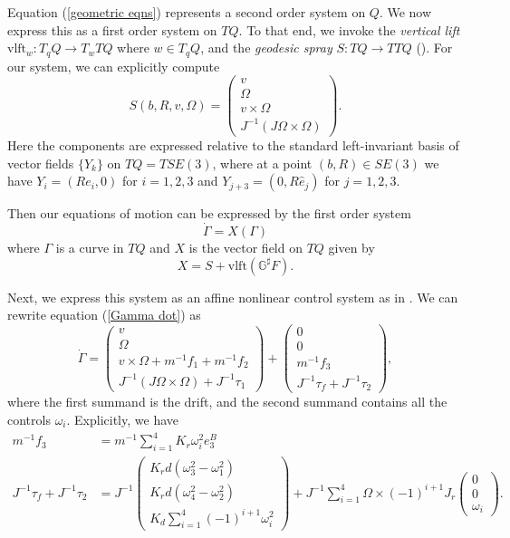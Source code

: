 \documentclass{aims}
\theoremstyle{definition}
\begin{document}
Equation (\ref{geometric eqns}) represents a second order system on $Q$.  We now express this as a first order system on $TQ$.  To that end, we invoke the \textit{vertical lift} $\text{vlft}_w: T_qQ \to T_wTQ$ where $w \in T_qQ$,  and the \textit{geodesic spray} $S:TQ \to TTQ$ (\cite{LewisMurray, DCDS}).
For our system, we can explicitly compute
$$S(b,R,v,\Omega)=\begin{pmatrix}v\\\Omega\\v\times\Omega\\J^{-1}(J\Omega\times\Omega)\end{pmatrix}.$$
Here the components are expressed relative to the standard left-invariant basis of vector fields $\{ Y_k\}$ on $TQ=TSE(3)$, where at a point $(b, R)\in SE(3)$ we have $Y_i=(Re_i,0)$ for $i=1, 2, 3$ and $Y_{j+3}=(0, R\hat{e}_j)$ for $j=1, 2, 3$.

Then our equations of motion can be expressed by the first order system
\begin{equation}\label{Gamma dot}
\dot \Gamma = X(\Gamma)
\end{equation}
where $\Gamma$ is a curve in $TQ$ and $X$ is the vector field on $TQ$ given by 
\begin{equation}
X = S + \text{vlft} (\mathbb G^\sharp F).
\end{equation}


Next, we express this system as an affine nonlinear control system as in \cite{Bloch book}.  
We can rewrite equation (\ref{Gamma dot}) as
\begin{equation}\label{Gamma dot again}
    \dot\Gamma = 
    \begin{pmatrix}
    v\\\Omega\\v\times\Omega +m^{-1}f_1+m^{-1}f_2\\J^{-1}(J\Omega\times\Omega)+J^{-1}\tau_1
    \end{pmatrix}+
    \begin{pmatrix}
    0\\0\\ m^{-1}f_3\\J^{-1}\tau_f +J^{-1}\tau_2    \end{pmatrix},
\end{equation}
where the first summand is the drift, and the second summand contains all the controls $\omega_i$.
Explicitly, we have
\begin{align*}
    m^{-1}f_3&= m^{-1}\sum_{i=1}^4K_r\omega^2_i e_3^B \\
    J^{-1}\tau_f +J^{-1}\tau_2&= J^{-1}\begin{pmatrix}K_rd(\omega_3^2-\omega_1^2)\\K_rd(\omega_4^2-\omega_2^2)\\K_d\sum_{i=1}^4(-1)^{i+1}\omega_i^2 \end{pmatrix}
    +J^{-1}\sum_{i=1}^4\Omega\times (-1)^{i+1}J_r
    \begin{pmatrix}
    0 \\ 0 \\ \omega_i
    \end{pmatrix}.
\end{align*}
\end{document}

